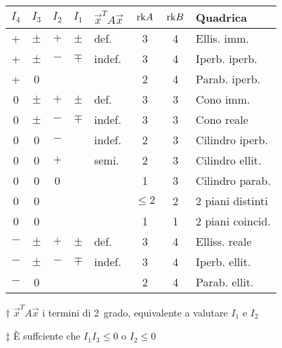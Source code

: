 {
\begin{threeparttable}
\setlength{\tabcolsep}{0.5em}%
\begin{tabular}{c|c|c|c|l|c|c|l}
	\boldmath$I_4$
	         & \boldmath$I_3$
	                 & \boldmath$I_2$
	                       & \boldmath$I_1$
	                               & \boldmath$\vec{x}^TA\vec{x}$\tnote{†}
	                                          & \boldmath$\mathrm{rk} A$
	                                              & \boldmath$\mathrm{rk} B$
	                                                     & \textbf{Quadrica} \\
	\hline
	+        & $\pm$ & $+$ & $\pm$ & def.     & 3 & 4    & Ellis. imm. \\
	+        & $\pm$ & $-$\tnote{‡} & $\mp$ & indef.   & 3 & 4    & Iperb. iperb. \\
	+        & 0     &     &       &          & 2 & 4    & Parab. iperb. \\
	\hline
	0        & $\pm$ & $+$ & $\pm$ & def.     & 3 & 3    & Cono imm. \\
	0        & $\pm$ & $-$ & $\mp$ & indef.   & 3 & 3    & Cono reale \\
	0        & 0     & $-$ &       & indef.    & 2 & 3    & Cilindro iperb. \\
	0        & 0     & $+$ &       & semi.   & 2 & 3    & Cilindro ellit. \\
	0        & 0     & 0   &       &          & 1 & 3    & Cilindro parab. \\
	0        & 0     &     &       &          & $\le 2$ & 2    & 2 piani distinti \\
	0        & 0     &     &       &          & 1 & 1    & 2 piani coincid. \\
	\hline
	$-$      & $\pm$ & $+$ & $\pm$ & def.     & 3 & 4    & Elliss. reale \\
	$-$      & $\pm$ & $-$\tnote{‡} & $\mp$ & indef.   & 3 & 4    & Iperb. ellit. \\
	$-$      & 0     &     &       &          & 2 & 4    & Parab. ellit. \\
\end{tabular}
\begin{tablenotes}
	\item[†] $\vec{x}^TA\vec{x}$ i termini di 2\textdegree\ grado, equivalente a valutare $I_1$ e $I_2$
	\item[‡] È suffciente che $I_1I_3 \le 0$ o $I_2 \le 0$
\end{tablenotes}
\end{threeparttable}
}
